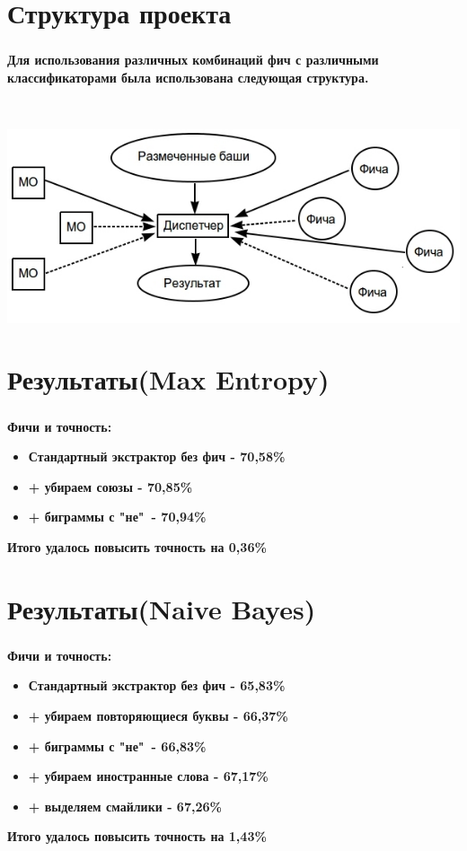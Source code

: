 \documentclass[t]{beamer}
\begin{document}
	
	
	
	\section{Структура проекта}
	\begin{frame}
		\frametitle{\insertsection}
		\textbf{Для использования различных комбинаций фич с различными классификаторами была использована следующая структура.}
		
		
		~
		
		\includegraphics[scale=0.52]{images/TheManager.jpg}
	\end{frame}	
	
	
	\section{Результаты(Max Entropy)}
	\begin{frame}
		\frametitle{\insertsection}
		\textbf{Фичи и точность:}
		\begin{itemize}
			\item \textbf{Стандартный экстрактор без фич - 70,58\%}
			\item \textbf{+ убираем союзы - 70,85\%}
			\item \textbf{+ биграммы с "не"\ - 70,94\%}
		\end{itemize}
		\textbf{\newline \newline Итого удалось повысить точность на 0,36\%}
	\end{frame}
	
	\section{Результаты(Naive Bayes)}
	\begin{frame}
		\frametitle{\insertsection}
		\textbf{Фичи и точность:}
		\begin{itemize}
			\item \textbf{Стандартный экстрактор без фич - 65,83\%}
			\item \textbf{+ убираем повторяющиеся буквы - 66,37\%}
			\item \textbf{+ биграммы с "не"\ - 66,83\%}
			\item \textbf{+ убираем иностранные слова - 67,17\%}
			\item \textbf{+ выделяем смайлики - 67,26\%}
		\end{itemize}
		\textbf{\newline \newline Итого удалось повысить точность на 1,43\%}
	\end{frame}
	
\end{document}
